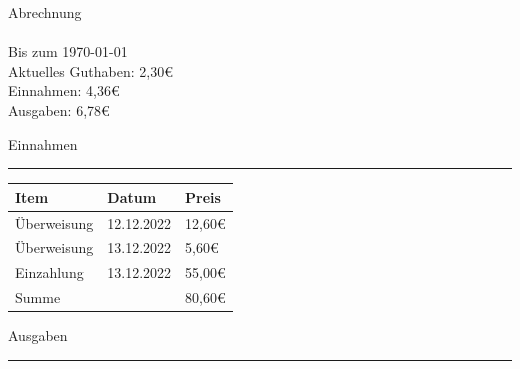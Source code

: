 \documentclass{article}
\begin{document}
\noindent\Huge Abrechnung\\\\
\noindent\Large Bis zum \today\\

\vspace{0.5cm}
\noindent\huge Aktuelles Guthaben: 2,30€\\

\noindent\Large Einnahmen: 4,36€\\
\noindent\Large Ausgaben: 6,78€\\

\vspace{0.5cm}
\begin{center}

{\setmainfont{headline-font.ttf}\Huge Einnahmen}

\rule{2.5cm}{0.25pt}

\vspace{0.5cm}

\begin{longtable}{>{\raggedright}p{8cm}>{\raggedright}p{3cm}>{\raggedright}p{2.5cm}}
\toprule
Item & Datum & Preis\tabularnewline\midrule
\rowcolor[gray]{.9} Überweisung    & 12.12.2022     & 12,60€\tabularnewline
Überweisung    & 13.12.2022     & 5,60€\tabularnewline
\rowcolor[gray]{.9}Einzahlung    & 13.12.2022     & 55,00€\tabularnewline\midrule
Summe & & 80,60€\tabularnewline
\bottomrule
\end{longtable}

\vspace{2cm}


{\setmainfont{headline-font.ttf}\Huge Ausgaben}

\rule{2.5cm}{0.25pt}

\vspace{0.5cm}


\end{center}
\end{document}
